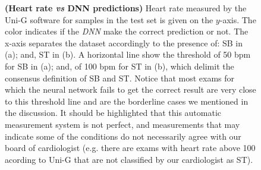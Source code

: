 \documentclass{article}
\begin{document}
\begin{figure}[h]
    \centering
    \caption{\textbf{(Heart rate \textit{vs} DNN predictions)} Heart rate measured by the Uni-G software for samples in the test set is given on the $y$-axis. The color indicates if the \textit{DNN} make the correct prediction or not. The x-axis separates the dataset accordingly to the presence of: SB in (a); and, ST in (b). A horizontal line show the threshold of 50 bpm for SB in (a); and, of 100 bpm for ST in (b), which delimit the consensus definition of SB and ST. Notice that most exams for which the neural network fails to get the correct result are very close to this threshold line and are the borderline cases we mentioned in the discussion. It should be highlighted that this automatic measurement system is not perfect, and measurements that may indicate some of the conditions  do not necessarily agree with our board of cardiologist (e.g. there are exams with heart rate above 100 acording to Uni-G that are not classified by our cardiologist as ST).}
    \label{fig:heart_rate_vs_mistakes}
\end{figure}
\end{document}
